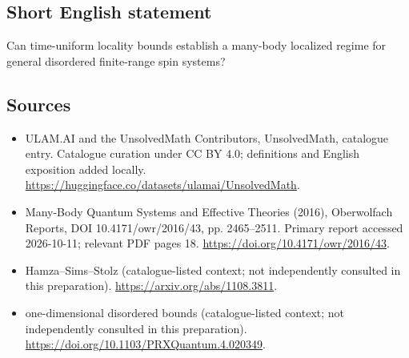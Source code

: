 \documentclass[11pt]{article}
\begin{document}
\subsection{Short English statement}
Can time-uniform locality bounds establish a many-body localized regime for general disordered finite-range spin systems?
\subsection{Sources}
\begin{itemize}
\item[\hypertarget{source:statement:1}{S1}] ULAM.AI and the UnsolvedMath Contributors, UnsolvedMath, catalogue entry. Catalogue curation under CC BY 4.0; definitions and English exposition added locally.
\url{https://huggingface.co/datasets/ulamai/UnsolvedMath}.
\item[\hypertarget{source:statement:2}{S2}] Many-Body Quantum Systems and Effective Theories (2016), Oberwolfach Reports, DOI 10.4171/owr/2016/43, pp. 2465--2511. Primary report accessed 2026-10-11; relevant PDF pages 18.
\url{https://doi.org/10.4171/owr/2016/43}.
\item[\hypertarget{source:statement:3}{S3}] Hamza--Sims--Stolz (catalogue-listed context; not independently consulted in this preparation).
\url{https://arxiv.org/abs/1108.3811}.
\item[\hypertarget{source:statement:4}{S4}] one-dimensional disordered bounds (catalogue-listed context; not independently consulted in this preparation).
\url{https://doi.org/10.1103/PRXQuantum.4.020349}.
\end{itemize}
\label{end:statement}
\end{document}
